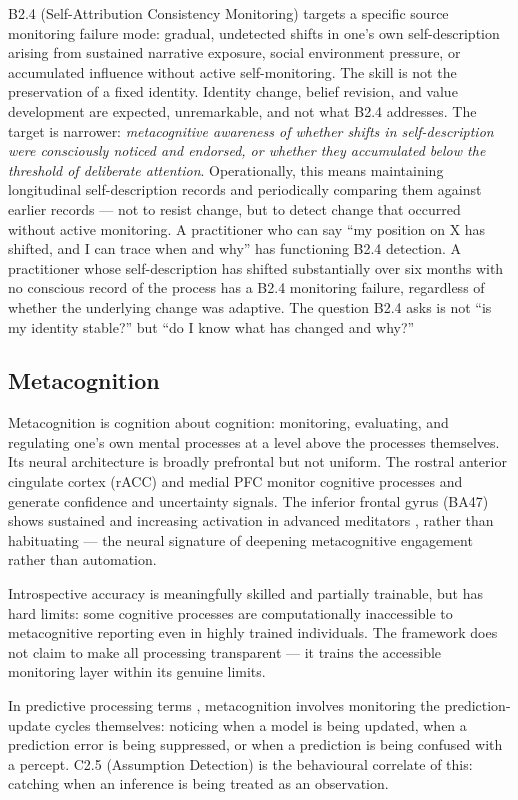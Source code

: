 \documentclass[12pt, a4paper]{article}
\begin{document}
B2.4 (Self-Attribution Consistency Monitoring) targets a specific source monitoring
failure mode: gradual, undetected shifts in one's own self-description arising from
sustained narrative exposure, social environment pressure, or accumulated influence
without active self-monitoring. The skill is not the preservation of a fixed
identity. Identity change, belief revision, and value development are expected,
unremarkable, and not what B2.4 addresses. The target is narrower:
\emph{metacognitive awareness of whether shifts in self-description were
consciously noticed and endorsed, or whether they accumulated below the threshold
of deliberate attention}. Operationally, this means maintaining longitudinal
self-description records and periodically comparing them against earlier records
--- not to resist change, but to detect change that occurred without active
monitoring. A practitioner who can say ``my position on X has shifted, and I
can trace when and why'' has functioning B2.4 detection. A practitioner whose
self-description has shifted substantially over six months with no conscious
record of the process has a B2.4 monitoring failure, regardless of whether the
underlying change was adaptive. The question B2.4 asks is not ``is my identity
stable?'' but ``do I know what has changed and why?''

\subsection{Metacognition}

Metacognition is cognition about cognition: monitoring, evaluating, and regulating
one's own mental processes at a level above the processes themselves. Its neural
architecture is broadly prefrontal but not uniform. The rostral anterior cingulate
cortex (rACC) and medial PFC monitor cognitive processes and generate confidence and
uncertainty signals. The inferior frontal gyrus (BA47) shows sustained and increasing
activation in advanced meditators \citep{calderone2024}, rather than habituating ---
the neural signature of deepening metacognitive engagement rather than automation.

Introspective accuracy is meaningfully skilled and partially trainable, but has hard
limits: some cognitive processes are computationally inaccessible to metacognitive
reporting even in highly trained individuals. The framework does not claim to make
all processing transparent --- it trains the accessible monitoring layer within its
genuine limits.

In predictive processing terms \citep{barrett2017}, metacognition involves monitoring
the prediction-update cycles themselves: noticing when a model is being updated,
when a prediction error is being suppressed, or when a prediction is being confused
with a percept. C2.5 (Assumption Detection) is the behavioural correlate of this:
catching when an inference is being treated as an observation.
\end{document}
